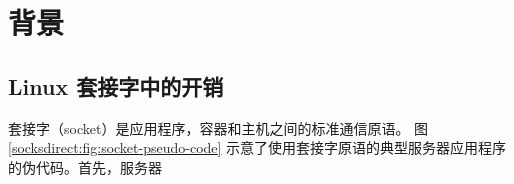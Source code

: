 \section{背景}
\label{socksdirect:sec:background}

\subsection{Linux 套接字中的开销}
\label{socksdirect:subsec:motivation}






套接字（socket）是应用程序，容器和主机之间的标准通信原语。
图 \ref{socksdirect:fig:socket-pseudo-code} 示意了使用套接字原语的典型服务器应用程序的伪代码。首先，服务器

